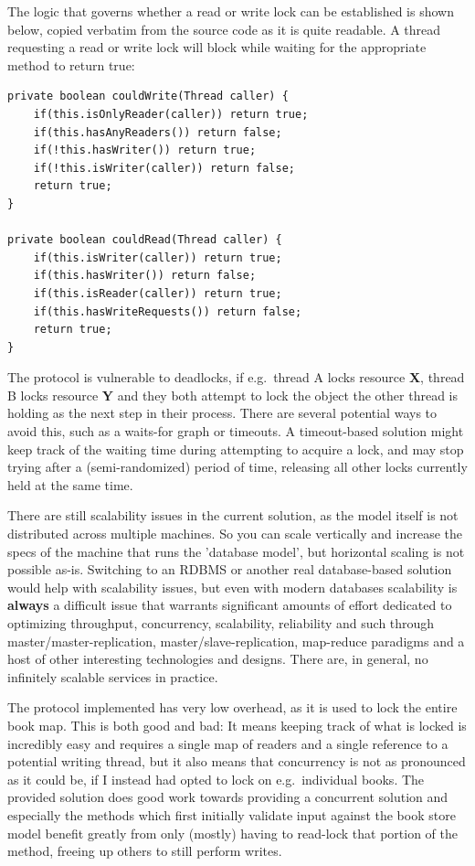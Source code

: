 The logic that governs whether a read or write lock can be established is shown
below, copied verbatim from the source code as it is quite readable. A thread
requesting a read or write lock will block while waiting for the appropriate
method to return true:

\begin{verbatim}
private boolean couldWrite(Thread caller) {
    if(this.isOnlyReader(caller)) return true;
    if(this.hasAnyReaders()) return false;
    if(!this.hasWriter()) return true;
    if(!this.isWriter(caller)) return false;
    return true;
}

private boolean couldRead(Thread caller) {
    if(this.isWriter(caller)) return true;
    if(this.hasWriter()) return false;
    if(this.isReader(caller)) return true;
    if(this.hasWriteRequests()) return false;
    return true;
}
\end{verbatim}

The protocol is vulnerable to deadlocks, if e.g.\ thread A locks resource
\textbf{X}, thread B locks resource \textbf{Y} and they both attempt to lock the
object the other thread is holding as the next step in their process. There are
several potential ways to avoid this, such as a waits-for graph or timeouts. A
timeout-based solution might keep track of the waiting time during attempting to
acquire a lock, and may stop trying after a (semi-randomized) period of time,
releasing all other locks currently held at the same time.

There are still scalability issues in the current solution, as the model itself
is not distributed across multiple machines. So you can scale vertically and
increase the specs of the machine that runs the 'database model', but horizontal
scaling is not possible as-is. Switching to an RDBMS or another real
database-based solution would help with scalability issues, but even with modern
databases scalability is \textbf{always} a difficult issue that warrants
significant amounts of effort dedicated to optimizing throughput, concurrency,
scalability, reliability and such through master/master-replication,
master/slave-replication, map-reduce paradigms and a host of other interesting
technologies and designs. There are, in general, no infinitely scalable services
in practice.

The protocol implemented has very low overhead, as it is used to lock the entire
book map. This is both good and bad: It means keeping track of what is locked is
incredibly easy and requires a single map of readers and a single reference to a
potential writing thread, but it also means that concurrency is not as
pronounced as it could be, if I instead had opted to lock on e.g.\ individual
books. The provided solution does good work towards providing a concurrent
solution and especially the methods which first initially validate input against
the book store model benefit greatly from only (mostly) having to read-lock that
portion of the method, freeing up others to still perform writes.
